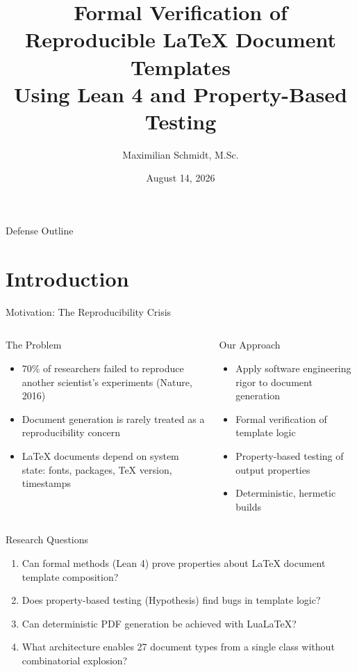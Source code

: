\documentclass[
  doctype=beamer,
  beameraspectratio=169,
  beamertheme=Copenhagen,
  language=english,
]{omnilatex}
\title[Formal Verification of LaTeX Templates]{Formal Verification of\\
Reproducible LaTeX Document Templates\\
Using Lean 4 and Property-Based Testing}
\author[M. Schmidt]{Maximilian Schmidt, M.Sc.}
\institute[TUHH]{Hamburg University of Technology (TUHH)\\Institute of Software Systems}
\date{August 14, 2026}
\begin{document}
\begin{frame}[plain]
  \titlepage
\end{frame}

\begin{frame}{Defense Outline}
  \tableofcontents[hideallsubsections]
\end{frame}

\section{Introduction}

\begin{frame}{Motivation: The Reproducibility Crisis}
  \begin{columns}[T]
    \begin{alertblock}{The Problem}
      \begin{itemize}
        \item 70\% of researchers failed to reproduce another scientist's experiments (Nature, 2016)
        \item Document generation is rarely treated as a reproducibility concern
        \item LaTeX documents depend on system state: fonts, packages, TeX version, timestamps
      \end{itemize}
    \end{alertblock}

    \begin{exampleblock}{Our Approach}
      \begin{itemize}
        \item Apply software engineering rigor to document generation
        \item Formal verification of template logic
        \item Property-based testing of output properties
        \item Deterministic, hermetic builds
      \end{itemize}
    \end{exampleblock}
  \end{columns}
\end{frame}

\begin{frame}{Research Questions}
  \begin{enumerate}
    \item Can formal methods (Lean 4) prove properties about LaTeX document template composition?
    \item Does property-based testing (Hypothesis) find bugs in template logic?
    \item Can deterministic PDF generation be achieved with LuaLaTeX?
    \item What architecture enables 27 document types from a single class without combinatorial explosion?
  \end{enumerate}
\end{frame}
\end{document}
